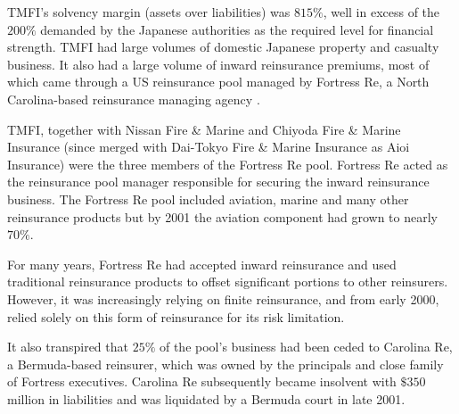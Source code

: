 \documentclass[12pt, a4paper]{report}
\begin{document}
TMFI's solvency margin (assets over liabilities) was $815\%$, well
in excess of the $200\%$ demanded by the Japanese authorities as
the required level for financial strength. TMFI had large volumes
of domestic Japanese property and casualty business. It also had a
large volume of inward reinsurance premiums, most of which came
through a US reinsurance pool managed by Fortress Re, a North
Carolina-based reinsurance managing agency .

TMFI, together with Nissan Fire \& Marine and Chiyoda Fire \&
Marine Insurance (since merged with Dai-Tokyo Fire \& Marine
Insurance as Aioi Insurance) were the three members of the
Fortress Re pool. Fortress Re acted as the reinsurance pool
manager responsible for securing the inward reinsurance business.
The Fortress Re pool included aviation, marine and many other
reinsurance products but by 2001 the aviation component had grown
to nearly $70\%$.

For many years, Fortress Re had accepted inward reinsurance and
used traditional reinsurance products to offset significant
portions to other reinsurers. However, it was increasingly relying
on finite reinsurance, and from early 2000, relied solely on this
form of reinsurance for its risk limitation.

It also transpired that $25\%$ of the pool's business had been
ceded to Carolina Re, a Bermuda-based reinsurer, which was owned
by the principals and close family of Fortress executives.
Carolina Re subsequently became insolvent with $\$350$ million in
liabilities and was liquidated by a Bermuda court in late 2001.
\end{document}
